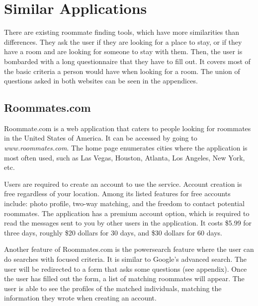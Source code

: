 \documentclass[journal]{./IEEE/IEEEtran}
\begin{document}
\pubidadjcol

\section{Similar Applications}
There are existing roommate finding tools, which have more similarities than differences. They ask the user if they are
looking for a place to stay, or if they have a room and are looking for someone to stay with them. Then, the user is
bombarded with a long questionnaire that they have to fill out. It covers most of the basic criteria a person would have when looking for a room. The union of questions asked in both websites can be seen in the appendices.

\subsection{Roommates.com}
Roommate.com\cite{roommates.com} is a web application that caters to people looking for roommates in the United States of America. It can be accessed by going to \textit{www.roommates.com}. The home page enumerates cities where the application is most often used, such as Las Vegas, Houston, Atlanta, Los Angeles, New York, etc.

Users are required to create an account to use the service. Account creation is free regardless of your location. Among
its listed features for free accounts include: photo profile, two-way matching, and the freedom to contact potential roommates. The application has a premium account option, which is required to read the messages sent to you by other users in the application. It costs \$5.99 for three days, roughly \$20 dollars for 30 days, and \$30 dollars for 60 days.

Another feature of Roommates.com is the powersearch feature where the user can do searches with focused criteria. It is similar to Google's advanced search. The user will be redirected to a form that asks some questions (see appendix). Once the user has filled out the form, a list of matching roommates will appear. The user is able to see the profiles of the matched individuals, matching the information they wrote when creating an account.
\end{document}
